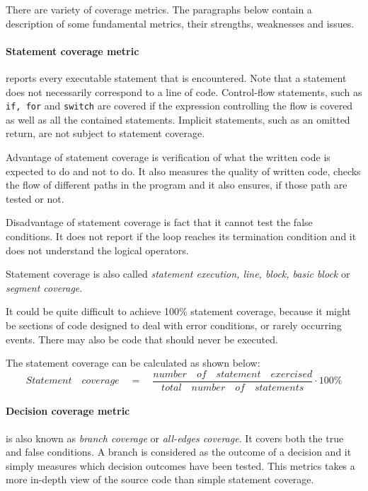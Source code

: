 There are variety of coverage metrics. The paragraphs below contain a description of some fundamental metrics, their strengths, weaknesses and issues. 

\paragraph{Statement coverage metric} reports every executable statement that is encountered.  Note that a statement does not necessarily correspond to a line of code. Control-flow statements, such as \texttt{if, for} and \texttt{switch} are covered if the expression controlling the flow is covered as well as all the contained statements. Implicit statements, such as an omitted return, are not subject to statement coverage. 

Advantage of statement coverage is verification of what the written code is expected to do and not to do. It also measures the quality of written code, checks the flow of different paths in the program and it also ensures, if those path are tested or not.

Disadvantage of statement coverage is fact that it cannot test the false conditions. It does not report if the loop reaches its termination condition and it does not understand the logical operators.

Statement coverage is also called \textit{statement execution, line, block, basic block} or \textit{segment coverage}.

It could be quite difficult to achieve 100\% statement coverage, because it might be sections of code designed to deal with error conditions, or rarely occurring events. There may also be code that should never be executed.

The statement coverage can be calculated as shown below:
\begin{equation}
Statement\quad coverage\quad =\quad \frac { number\quad of\quad statement\quad exercised }{ total\quad number\quad of\quad statements } \cdot 100\%
\end{equation}


\paragraph{Decision coverage metric} is also known as \textit{branch coverage} or \textit{all-edges coverage}. It covers both the true and false conditions.  A branch is considered as the outcome of a decision and it  simply measures which decision outcomes have been tested. This metrics takes a more in-depth view of the source code than simple statement coverage.

